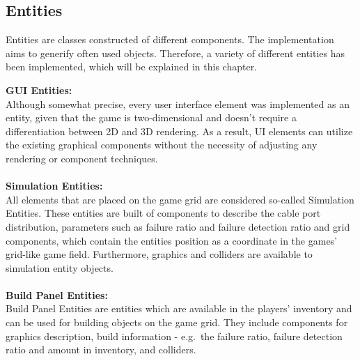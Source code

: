 \subsection{Entities}\label{subsec:entities}
Entities are classes constructed of different components.
The implementation aims to generify often used objects.
Therefore, a variety of different entities has been implemented, which will be explained in this chapter.

\textbf{GUI Entities:} \\
Although somewhat precise, every user interface element was implemented as an entity, given that the game is two-dimensional and doesn't require a differentiation between 2D and 3D rendering.
As a result, UI elements can utilize the existing graphical components without the necessity of adjusting any rendering or component techniques.
\\ \\
\textbf{Simulation Entities:} \\
All elements that are placed on the game grid are considered so-called Simulation Entities.
These entities are built of components to describe the cable port distribution, parameters such as failure ratio and failure detection ratio and grid components, which contain the
entities position as a coordinate in the games' grid-like game field.
Furthermore, graphics and colliders are available to simulation entity objects.
\\ \\
\textbf{Build Panel Entities:} \\
Build Panel Entities are entities which are available in the players' inventory and can be used for building objects on the game grid.
They include components for graphics description, build information - e.g.\ the failure ratio, failure detection ratio and amount in inventory,
and colliders.

